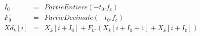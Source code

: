 \begin{eqnarray*}
I_0 & = & Partie Entiere(-t_0 . f_e ) \\
F_0 & = & Partie Decimale(-t_0 . f_e ) \\
Xd_k[i] & = & X_k[i+I_0] + F_0.\left( X_k[i+I_0+1] + X_k[i+I_0] \right) \\
\end{eqnarray*}
